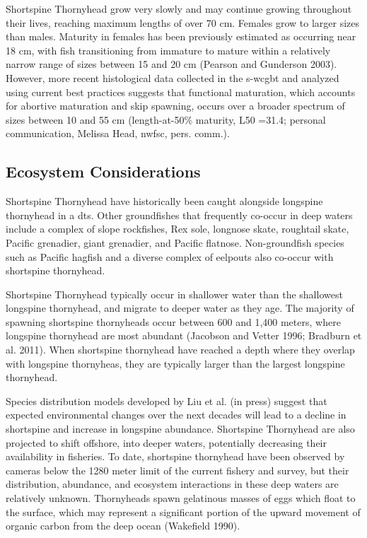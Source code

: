 \documentclass[11pt,
  english,
  letterpaper,
]{article}
\begin{document}
Shortspine Thornyhead grow very slowly and may continue growing throughout their lives, reaching maximum lengths of over 70 cm. Females grow to larger sizes than males. Maturity in females has been previously estimated as occurring near 18 cm, with fish transitioning from immature to mature within a relatively narrow range of sizes between 15 and 20 cm (Pearson and Gunderson 2003). However, more recent histological data collected in the \gls{s-wcgbt} and analyzed using current best practices suggests that functional maturation, which accounts for abortive maturation and skip spawning, occurs over a broader spectrum of sizes between 10 and 55 cm (length-at-50\% maturity, L50 =31.4; personal communication, Melissa Head, \gls{nwfsc}, pers. comm.).

\hypertarget{ecosystem-considerations-1}{%
\subsection{Ecosystem Considerations}\label{ecosystem-considerations-1}}

Shortspine Thornyhead have historically been caught alongside longspine thornyhead in a \gls{dts}. Other groundfishes that frequently co-occur in deep waters include a complex of slope rockfishes, Rex sole, longnose skate, roughtail skate, Pacific grenadier, giant grenadier, and Pacific flatnose. Non-groundfish species such as Pacific hagfish and a diverse complex of eelpouts also co-occur with shortspine thornyhead.

Shortspine Thornyhead typically occur in shallower water than the shallowest longspine thornyhead, and migrate to deeper water as they age. The majority of spawning shortspine thornyheads occur between 600 and 1,400 meters, where longspine thornyhead are most abundant (Jacobson and Vetter 1996; Bradburn et al. 2011). When shortspine thornyhead have reached a depth where they overlap with longspine thornyheas, they are typically larger than the largest longspine thornyhead.

Species distribution models developed by Liu et al. (in press) suggest that expected environmental changes over the next decades will lead to a decline in shortspine and increase in longspine abundance. Shortspine Thornyhead are also projected to shift offshore, into deeper waters, potentially decreasing their availability in fisheries. To date, shortspine thornyhead have been observed by cameras below the 1280 meter limit of the current fishery and survey, but their distribution, abundance, and ecosystem interactions in these deep waters are relatively unknown. Thornyheads spawn gelatinous masses of eggs which float to the surface, which may represent a significant portion of the upward movement of organic carbon from the deep ocean (Wakefield 1990).
\end{document}
